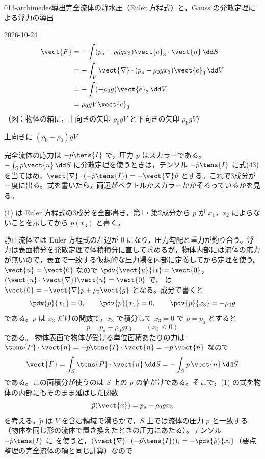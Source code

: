 \documentclass[uplatex,dvipdfmx,a4paper,11pt]{jsarticle}
\begin{document}
\begin{mondai}{013-archimedes}{導出}{完全流体の静水圧（Euler 方程式）と，Gauss の発散定理による浮力の導出}
\begin{kotaeutsushi}{2026-10-24}
\begin{align*}
\vect{F}&=-\int(p_{\mathrm{a}}-\rho_{0}gx_{3})\vect{e}_{3}\cdot\vect{n}\,\dd S\\
&=-\int_{V}\vect{\nabla}\cdot(p_{\mathrm{a}}-\rho_{0}gx_{3})\vect{e}_{3}\,\dd V\\
&=-\int(-\rho_{0}g)\vect{e}_{3}\,\dd V\\
&=\rho_{0}gV\vect{e}_{3}
\end{align*}
（図：物体の箱に，上向きの矢印 $\rho_{0}gV$ と下向きの矢印 $\rho_{\mathrm{b}}gV$）

上向きに $(\rho_{\mathrm{b}}-\rho_{0})gV$
\end{kotaeutsushi}
\begin{kizuki}
\item 完全流体の応力は $-p\tens{I}$ で，圧力 $p$ はスカラーである。$-\int_{S}p\vect{n}\,\dd S$ に発散定理を使うときは，テンソル $-\tilde{p}\tens{I}$ に式(43) を当てはめ，$\vect{\nabla}\cdot(-\tilde{p}\tens{I})=-\vect{\nabla}\tilde{p}$ とする。これで3成分が一度に出る。式を書いたら，両辺がベクトルかスカラーかがそろっているかを見る。
\item (1) は Euler 方程式の3成分を全部書き，第1・第2成分から $p$ が $x_{1}$，$x_{2}$ によらないことを示してから $p(x_{3})$ と書く。
\end{kizuki}
\begin{tadashii}
\houshin 静止流体では Euler 方程式の左辺が $0$ になり，圧力勾配と重力が釣り合う。浮力は表面積分を発散定理で体積積分に直して求めるが，物体内部には流体の応力が無いので，表面で一致する仮想的な圧力場を内部に定義してから定理を使う。
\keisan {} $\vect{u}=\vect{0}$ なので $\pdv{\vect{u}}{t}=\vect{0}$，$(\vect{u}\cdot\vect{\nabla})\vect{u}=\vect{0}$ で， は $\vect{0}=-\vect{\nabla}p+\rho_0\vect{g}$ となる。成分で書くと
\[ \pdv{p}{x_1}=0,\qquad \pdv{p}{x_2}=0,\qquad \pdv{p}{x_3}=-\rho_0g \]
である。$p$ は $x_3$ だけの関数で，$x_3$ で積分して $x_3=0$ で $p=p_{\mathrm{a}}$ とすると
\[ p=p_{\mathrm{a}}-\rho_0gx_3\qquad(x_3\le0) \]
である。
 物体表面で物体が受ける単位面積あたりの力は $\tens{P}\cdot\vect{n}=-p\tens{I}\cdot\vect{n}=-p\,\vect{n}$ なので
\[ \vect{F}=\int_S\tens{P}\cdot\vect{n}\,\dd S=-\int_Sp\,\vect{n}\,\dd S \]
である。この面積分が使うのは $S$ 上の $p$ の値だけである。そこで，(1) の式を物体の内部にもそのまま延ばした関数
\[ \tilde{p}(\vect{x})=p_{\mathrm{a}}-\rho_0gx_3 \]
を考える。$\tilde{p}$ は $V$ を含む領域で滑らかで，$S$ 上では流体の圧力 $p$ と一致する（物体を同じ形の流体で置き換えたときの圧力にあたる）。テンソル $-\tilde{p}\tens{I}$ に  を使うと，$(\vect{\nabla}\cdot(-\tilde{p}\tens{I}))_i=-\pdv{\tilde{p}}{x_i}$（要点整理の完全流体の項と同じ計算）なので

\end{tadashii}
\end{mondai}
\end{document}
